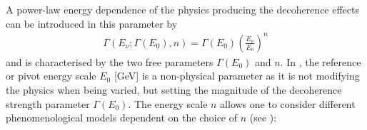A power-law energy dependence of the physics producing the decoherence effects can be introduced in this parameter by \cite{Lisi:2000zt,Gomes:2020muc, Coloma:2018idr, QD_Stutt_Jens_2020}
\vspace{-3mm}%
\begin{align} \label{gamma-parameter}
   \Gamma(E_\nu;\Gamma(E_0), n) = \Gamma(E_0)\left( \frac{E_\nu}{E_0} \right)^n 
\end{align}
and is characterised by the two free parameters $\Gamma(E_0)$ and $n$. In , the reference or pivot energy scale $E_0$ [GeV] is a non-physical parameter as it is not modifying the physics when being varied, but setting the magnitude of the decoherence strength parameter $\Gamma(E_0)$. The energy scale $n$ allows one to consider different phenomenological models dependent on the choice of $n$ (see ):
%
\begin{table}[hbt]
    \centering
    \caption[]{Phenomenological Models according to the energy dependence of the decoherence strength $\Gamma$ set by the choice of the energy scale $n$.}
    \label{tab:energy_scale_models}
\end{table}
%
\iffalse
%
